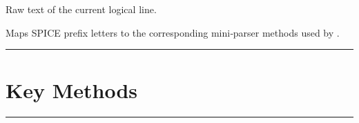 \documentclass[letterpaper,10pt,english]{sphinxmanual}
\begin{document}
\begin{fulllineitems}
\begin{fulllineitems}
\end{fulllineitems}


\begin{fulllineitems}
\label{\detokenize{parser:NetlistParser.raw_line_text}}
\pysigstartsignatures
\pysigline
{}
\pysigstopsignatures
\sphinxAtStartPar
{} \textendash{} Raw text of the current logical line.

\end{fulllineitems}


\begin{fulllineitems}
\label{\detokenize{parser:NetlistParser.dispatch_registry}}
\pysigstartsignatures
\pysigline
{}
\pysigstopsignatures
\sphinxAtStartPar
{} \textendash{} Maps SPICE prefix letters to the corresponding mini‑parser
methods used by .

\end{fulllineitems}


\end{fulllineitems}



\bigskip\hrule\bigskip



\section{Key Methods}
\label{\detokenize{parser:key-methods}}

\bigskip\hrule\bigskip
\end{document}
